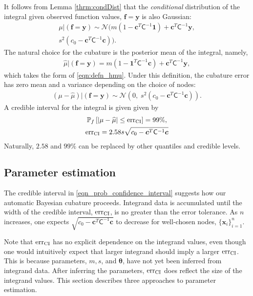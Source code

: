 \documentclass[twocolumn]{svjour3}          %
\newcommand{\bm}[1]{\boldsymbol{#1}}
\newcommand{\vtheta}{{\bm{\theta}}}
\newcommand{\vc}{\bm{c}}
\newcommand{\vf}{\bm{f}}
\newcommand{\vx}{\bm{x}}
\newcommand{\vy}{\bm{y}}
\newcommand{\vone}{\bm{1}}
\newcommand{\mC}{\mathsf{C}}
\newcommand{\calN}{\mathcal{N}}
\newcommand{\hmu}{\widehat{\mu}}
\newcommand{\err}{\textup{err}}
\begin{document}
It follows from Lemma \ref{thrm:condDist} that the \emph{conditional} distribution of the integral given observed function values, $\vf = \vy$ is also Gaussian:
\begin{multline} \label{eqn:condInteg}
\mu | (\vf = \vy) \sim \calN \bigl(m (1 - \vc^T \mC^{-1} \vone)  + \vc^T \mC^{-1} \vy, 
\\
s^2(c_0  -\vc ^T \mC^{-1} \vc) \bigr).
\end{multline}
The natural choice for  the cubature is the posterior mean of the integral, namely, 
\begin{align}
\label{eqn:BayesCub}
\widehat{\mu}  \vert ( \vf = \vy)
= m(1 - \vone^T  \mC^{-1}\vc )
+ \vc^T \mC^{-1} \vy,
\end{align}
which takes the form of \eqref{eqn:defn_hmu}.
Under this definition, the cubature error has zero mean and a variance depending on the choice of nodes:
\begin{align*}
(\mu-\hmu) | (\vf = \vy)
 \sim  \calN 
\left(
0, \;
s^2 (c_0 - \vc^T\mC^{-1}\vc) 
\right).
\end{align*}
A credible interval for the integral is given given by 
\begin{subequations} \label{eqn_prob_confidence_interval}
\begin{gather}
\mathbb{P}_f \left[
|\mu-\hmu| \leq \err_{\textup{CI}}
\right] = 99\%, \\
\err_{\textup{CI}} = 2.58 s \sqrt{c_0 - \vc^T\mC^{-1}\vc}
\end{gather}
\end{subequations}
Naturally, $2.58$ and $99\%$ can be replaced by other quantiles and credible levels.


\subsection{Parameter estimation}
The credible interval in \eqref{eqn_prob_confidence_interval} suggests how our automatic Bayesian cubature proceeds.  Integrand data is accumulated until the width of the credible interval, $\err_{\textup{CI}}$, is no greater than the error tolerance.  As $n$ increases, one expects $\sqrt{c_0 - \vc^T\mC^{-1}\vc}$ to decrease for well-chosen nodes, $\{\vx_i\}_{i=1}^n$.

Note that $\err_{\textup{CI}}$ has no explicit dependence on the integrand values, even though one would intuitively expect that larger integrand should imply a  larger $\err_{\textup{CI}}$.  This is because parameters, $m, s$, and $\vtheta$, have not yet been inferred from integrand data.  After inferring the parameters, $\err_{\textup{CI}}$ does reflect the size of the integrand values. This section describes three approaches to parameter estimation.
\end{document}
